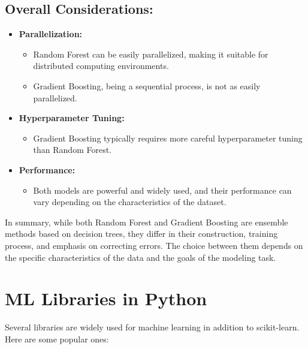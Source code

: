 \documentclass[
]{book}
\providecommand{\tightlist}{%
  \setlength{\itemsep}{0pt}\setlength{\parskip}{0pt}}
\begin{document}
\hypertarget{overall-considerations}{%
\subsection{Overall Considerations:}\label{overall-considerations}}

\begin{itemize}
\tightlist
\item
  \textbf{Parallelization:}

  \begin{itemize}
  \tightlist
  \item
    Random Forest can be easily parallelized, making it suitable for distributed computing environments.
  \item
    Gradient Boosting, being a sequential process, is not as easily parallelized.
  \end{itemize}
\item
  \textbf{Hyperparameter Tuning:}

  \begin{itemize}
  \tightlist
  \item
    Gradient Boosting typically requires more careful hyperparameter tuning than Random Forest.
  \end{itemize}
\item
  \textbf{Performance:}

  \begin{itemize}
  \tightlist
  \item
    Both models are powerful and widely used, and their performance can vary depending on the characteristics of the dataset.
  \end{itemize}
\end{itemize}

In summary, while both Random Forest and Gradient Boosting are ensemble methods based on decision trees, they differ in their construction, training process, and emphasis on correcting errors. The choice between them depends on the specific characteristics of the data and the goals of the modeling task.

\hypertarget{ml-libraries-in-python}{%
\section{ML Libraries in Python}\label{ml-libraries-in-python}}

Several libraries are widely used for machine learning in addition to scikit-learn. Here are some popular ones:
\end{document}
